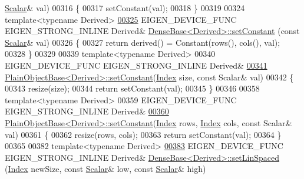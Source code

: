 \begin{DoxyCode}
      \hyperlink{group___core___module_a5feed465b3a8e60c47e73ecce83e39a2}{Scalar}& val)
00316 \{
00317   setConstant(val);
00318 \}
00319 
00324 \textcolor{keyword}{template}<\textcolor{keyword}{typename} Derived>
\hyperlink{group___core___module_a19b2bc788277e9ab3f967a8857e290ae}{00325} EIGEN\_DEVICE\_FUNC EIGEN\_STRONG\_INLINE Derived& \hyperlink{group___core___module_a19b2bc788277e9ab3f967a8857e290ae}{DenseBase<Derived>::setConstant}
      (\textcolor{keyword}{const} \hyperlink{group___core___module_a5feed465b3a8e60c47e73ecce83e39a2}{Scalar}& val)
00326 \{
00327   \textcolor{keywordflow}{return} derived() = Constant(rows(), cols(), val);
00328 \}
00329 
00339 \textcolor{keyword}{template}<\textcolor{keyword}{typename} Derived>
00340 EIGEN\_DEVICE\_FUNC EIGEN\_STRONG\_INLINE Derived&
\hyperlink{class_eigen_1_1_plain_object_base_ac8dea1df3d92b752cc683ff42abf6f9b}{00341} \hyperlink{class_eigen_1_1_plain_object_base_ac8dea1df3d92b752cc683ff42abf6f9b}{PlainObjectBase<Derived>::setConstant}(\hyperlink{namespace_eigen_a62e77e0933482dafde8fe197d9a2cfde}{Index} size, \textcolor{keyword}{const} Scalar& 
      val)
00342 \{
00343   resize(size);
00344   \textcolor{keywordflow}{return} setConstant(val);
00345 \}
00346 
00358 \textcolor{keyword}{template}<\textcolor{keyword}{typename} Derived>
00359 EIGEN\_DEVICE\_FUNC EIGEN\_STRONG\_INLINE Derived&
\hyperlink{class_eigen_1_1_plain_object_base_a56d1fe5d2156174f88341e563bb3c5a9}{00360} \hyperlink{class_eigen_1_1_plain_object_base_ac8dea1df3d92b752cc683ff42abf6f9b}{PlainObjectBase<Derived>::setConstant}(\hyperlink{namespace_eigen_a62e77e0933482dafde8fe197d9a2cfde}{Index} rows, 
      \hyperlink{namespace_eigen_a62e77e0933482dafde8fe197d9a2cfde}{Index} cols, \textcolor{keyword}{const} Scalar& val)
00361 \{
00362   resize(rows, cols);
00363   \textcolor{keywordflow}{return} setConstant(val);
00364 \}
00365 
00382 \textcolor{keyword}{template}<\textcolor{keyword}{typename} Derived>
\hyperlink{group___core___module_a17a69cfd1b44b64f26b1a0f00666a871}{00383} EIGEN\_DEVICE\_FUNC EIGEN\_STRONG\_INLINE Derived& \hyperlink{group___core___module_a17a69cfd1b44b64f26b1a0f00666a871}{DenseBase<Derived>::setLinSpaced}
      (\hyperlink{namespace_eigen_a62e77e0933482dafde8fe197d9a2cfde}{Index} newSize, \textcolor{keyword}{const} \hyperlink{group___core___module_a5feed465b3a8e60c47e73ecce83e39a2}{Scalar}& low, \textcolor{keyword}{const} \hyperlink{group___core___module_a5feed465b3a8e60c47e73ecce83e39a2}{Scalar}& high)

\end{DoxyCode}
